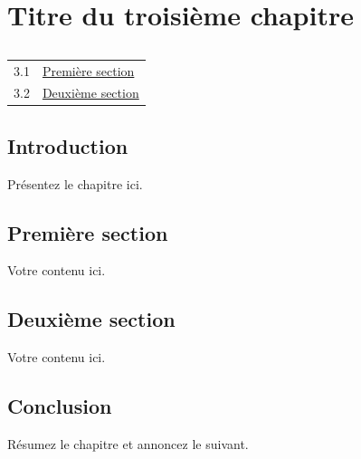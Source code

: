 \chapter{Titre du troisième chapitre}

\section*{\outlinename}
\begin{center}
\begin{tabular}{cl}
  3.1 & \hyperref[sec:ch3-first]{Première section} \\
  3.2 & \hyperref[sec:ch3-second]{Deuxième section} \\
\end{tabular}
\end{center}

\section*{Introduction}

Présentez le chapitre ici.

\vfill
\newpage

\section{Première section}\label{sec:ch3-first}

Votre contenu ici.

\section{Deuxième section}\label{sec:ch3-second}

Votre contenu ici.

\section*{Conclusion}

Résumez le chapitre et annoncez le suivant.

\newpage
